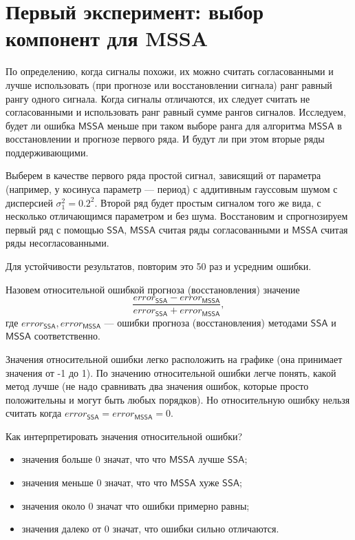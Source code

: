 \documentclass[specialist, substylefile = spbureport.rtx,
    subf,href,colorlinks=true, 12pt]{disser}
\newcommand{\SSA}{\mathsf{SSA}}
\newcommand{\MSSA}{\mathsf{MSSA}}
\begin{document}
    \section{Первый эксперимент: выбор компонент для MSSA}
        По определению, когда сигналы похожи, их можно считать согласованными и лучше использовать (при прогнозе или восстановлении сигнала) ранг равный рангу одного сигнала. Когда сигналы отличаются, их следует считать не согласованными и использовать ранг равный сумме рангов сигналов. Исследуем, будет ли ошибка $\MSSA$ меньше при таком выборе ранга для алгоритма $\MSSA$ в восстановлении и прогнозе первого ряда. И будут ли при этом вторые ряды поддерживающими.

        Выберем в качестве первого ряда простой сигнал, зависящий от параметра (например, у косинуса параметр --- период) с аддитивным гауссовым шумом с дисперсией $\sigma_1^2 = 0.2^2$.
        Второй ряд будет простым сигналом того же вида, с несколько отличающимся параметром и без шума.
        Восстановим и спрогнозируем первый ряд с помощью $\SSA$, $\MSSA$ считая ряды согласованными и $\MSSA$ считая ряды несогласованными.

        Для устойчивости результатов, повторим это 50 раз и усредним ошибки.

        Назовем относительной ошибкой прогноза (восстановления) значение $$\displaystyle \frac{error_{\SSA} - error_{\MSSA}}{error_{\SSA} + error_{\MSSA}},$$ где $error_{\SSA}, error_{\MSSA}$ --- ошибки прогноза (восстановления) методами $\SSA$ и $\MSSA$ соответственно.
        
        Значения относительной ошибки легко расположить на графике (она принимает значения от -1 до 1). По значению относительной ошибки легче понять, какой метод лучше (не надо сравнивать два значения ошибок, которые просто положительны и могут быть любых порядков). Но относительную ошибку нельзя считать когда $error_{\SSA} = error_{\MSSA} = 0$.
        
        Как интерпретировать значения относительной ошибки? 
        \begin{itemize}
            \item значения больше $0$ значат, что что $\MSSA$ лучше $\SSA$;
            \item значения меньше $0$ значат, что что $\MSSA$ хуже $\SSA$;
            \item значения около $0$ значат что ошибки примерно равны;
            \item значения далеко от $0$ значат, что ошибки сильно отличаются.
        \end{itemize}
\end{document}

